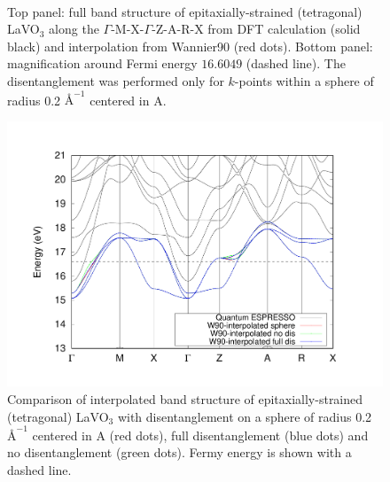 \begin{figure}[t!]
\centering
{}\\
\caption{Top panel: full band structure of epitaxially-strained (tetragonal) LaVO$_3$ along the $\Gamma$-M-X-$\Gamma$-Z-A-R-X from DFT calculation (solid black) and interpolation from Wannier90 (red dots). Bottom panel: magnification around Fermi energy $16.6049$ (dashed line). The disentanglement was performed only for $k$-points within a sphere of radius 0.2 $\si{\angstrom}^{-1}$ centered in A.}
\label{fig20.1}
\end{figure}

\begin{figure}[h!]
\centering
\includegraphics[width=0.7\columnwidth]{figure/example20/LaVO3_bandstructure_all.pdf}
\caption{Comparison of interpolated band structure of epitaxially-strained (tetragonal) LaVO$_3$ with disentanglement on a sphere of radius 0.2 $\si{\angstrom}^{-1}$ centered in A (red dots), full disentanglement (blue dots) and no disentanglement (green dots). Fermy energy is shown with a dashed line.}\label{fig20.2}
\end{figure}

